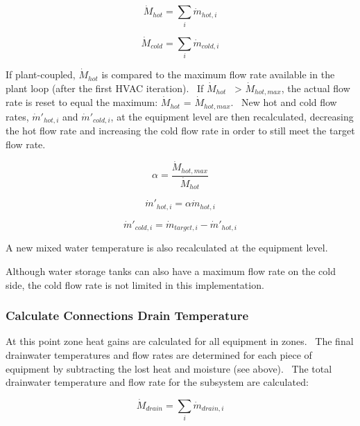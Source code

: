\begin{equation}
{\dot M_{hot}} = \mathop \sum \limits_i {\dot m_{hot,i}}
\end{equation}

\begin{equation}
{\dot M_{cold}} = \mathop \sum \limits_i {\dot m_{cold,i}}
\end{equation}

If plant-coupled, \({\dot M_{hot}}\) is compared to the maximum flow rate available in the plant loop (after the first HVAC iteration).~ If \({\dot M_{hot}}\) ~\textgreater{} \({\dot M_{hot,max}}\), the actual flow rate is reset to equal the maximum: \({\dot M_{hot}}\) = \({\dot M_{hot,max}}\).~ New hot and cold flow rates, \({\dot m'_{hot,i}}\) and \({\dot m'_{cold,i}}\), at the equipment level are then recalculated, decreasing the hot flow rate and increasing the cold flow rate in order to still meet the target flow rate.

\begin{equation}
\alpha  = \frac{{{{\dot M}_{hot,max}}}}{{{{\dot M}_{hot}}}}
\end{equation}

\begin{equation}
{\dot m'_{hot,i}} = \alpha {\dot m_{hot,i}}
\end{equation}

\begin{equation}
{\dot m'_{cold,i}} = {\dot m_{target,i}} - {\dot m'_{hot,i}}
\end{equation}

A new mixed water temperature is also recalculated at the equipment level.

Although water storage tanks can also have a maximum flow rate on the cold side, the cold flow rate is not limited in this implementation.

\subsubsection{Calculate Connections Drain Temperature}\label{calculate-connections-drain-temperature}

At this point zone heat gains are calculated for all equipment in zones.~ The final drainwater temperatures and flow rates are determined for each piece of equipment by subtracting the lost heat and moisture (see above).~ The total drainwater temperature and flow rate for the subsystem are calculated:

\begin{equation}
{\dot M_{drain}} = \mathop \sum \limits_i {\dot m_{drain,i}}
\end{equation}

